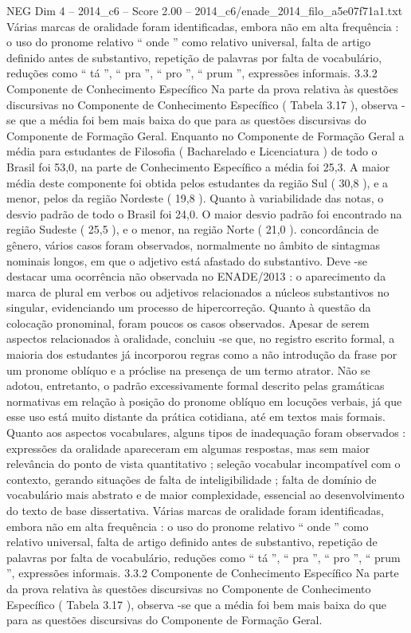 \begin{textsample}{NEG Dim 4 – 2014\_c6 – Score 2.00 – 2014\_c6/enade\_2014\_filo\_a5e07f71a1.txt}
Várias marcas de oralidade foram identificadas, embora não em alta frequência : o uso do pronome relativo “ onde ” como relativo universal, falta de artigo definido antes de substantivo, repetição de palavras por falta de vocabulário, reduções como “ tá ”, “ pra ”, “ pro ”, “ prum ”, expressões informais. 3.3.2 Componente de Conhecimento Específico Na parte da prova relativa às questões discursivas no Componente de Conhecimento Específico ( Tabela 3.17 ), observa -se que a média foi bem mais baixa do que para as questões discursivas do Componente de Formação Geral.
Enquanto no Componente de Formação Geral a média para estudantes de Filosofia ( Bacharelado e Licenciatura ) de todo o Brasil foi 53,0, na parte de Conhecimento Específico a média foi 25,3.
A maior média deste componente foi obtida pelos estudantes da região Sul ( 30,8 ), e a menor, pelos da região Nordeste ( 19,8 ).
Quanto à variabilidade das notas, o desvio padrão de todo o Brasil foi 24,0.
O maior desvio padrão foi encontrado na região Sudeste ( 25,5 ), e o menor, na região Norte ( 21,0 ). concordância de gênero, vários casos foram observados, normalmente no âmbito de sintagmas nominais longos, em que o adjetivo está afastado do substantivo.
Deve -se destacar uma ocorrência não observada no ENADE/2013 : o aparecimento da marca de plural em verbos ou adjetivos relacionados a núcleos substantivos no singular, evidenciando um processo de hipercorreção.
Quanto à questão da colocação pronominal, foram poucos os casos observados.
Apesar de serem aspectos relacionados à oralidade, concluiu -se que, no registro escrito formal, a maioria dos estudantes já incorporou regras como a não introdução da frase por um pronome oblíquo e a próclise na presença de um termo atrator.
Não se adotou, entretanto, o padrão excessivamente formal descrito pelas gramáticas normativas em relação à posição do pronome oblíquo em locuções verbais, já que esse uso está muito distante da prática cotidiana, até em textos mais formais.
Quanto aos aspectos vocabulares, alguns tipos de inadequação foram observados : expressões da oralidade apareceram em algumas respostas, mas sem maior relevância do ponto de vista quantitativo ; seleção vocabular incompatível com o contexto, gerando situações de falta de inteligibilidade ; falta de domínio de vocabulário mais abstrato e de maior complexidade, essencial ao desenvolvimento do texto de base dissertativa.
Várias marcas de oralidade foram identificadas, embora não em alta frequência : o uso do pronome relativo “ onde ” como relativo universal, falta de artigo definido antes de substantivo, repetição de palavras por falta de vocabulário, reduções como “ tá ”, “ pra ”, “ pro ”, “ prum ”, expressões informais. 3.3.2 Componente de Conhecimento Específico Na parte da prova relativa às questões discursivas no Componente de Conhecimento Específico ( Tabela 3.17 ), observa -se que a média foi bem mais baixa do que para as questões discursivas do Componente de Formação Geral.

\end{textsample}
